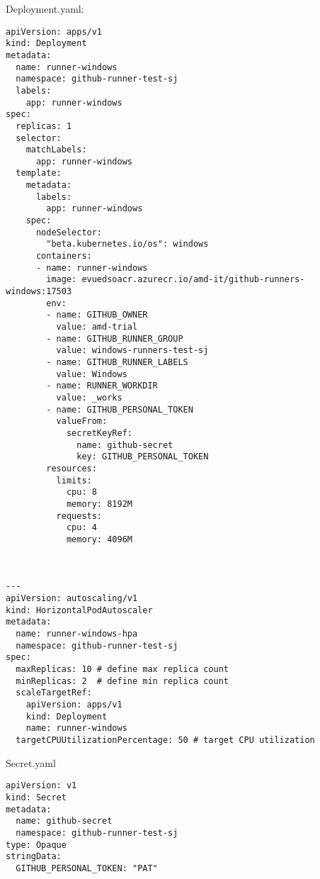Deployment.yaml:
\begin{lstlisting}[breaklines]
apiVersion: apps/v1
kind: Deployment
metadata:
  name: runner-windows
  namespace: github-runner-test-sj
  labels:
    app: runner-windows
spec:
  replicas: 1
  selector:
    matchLabels:
      app: runner-windows
  template:
    metadata:
      labels:
        app: runner-windows
    spec:
      nodeSelector:
        "beta.kubernetes.io/os": windows
      containers:
      - name: runner-windows
        image: evuedsoacr.azurecr.io/amd-it/github-runners-windows:17503
        env:
        - name: GITHUB_OWNER
          value: amd-trial
        - name: GITHUB_RUNNER_GROUP
          value: windows-runners-test-sj
        - name: GITHUB_RUNNER_LABELS
          value: Windows
        - name: RUNNER_WORKDIR
          value: _works
        - name: GITHUB_PERSONAL_TOKEN 
          valueFrom:
            secretKeyRef:
              name: github-secret
              key: GITHUB_PERSONAL_TOKEN
        resources:
          limits:
            cpu: 8
            memory: 8192M
          requests:
            cpu: 4
            memory: 4096M
      

           
---
apiVersion: autoscaling/v1
kind: HorizontalPodAutoscaler
metadata:
  name: runner-windows-hpa
  namespace: github-runner-test-sj
spec:
  maxReplicas: 10 # define max replica count
  minReplicas: 2  # define min replica count
  scaleTargetRef:
    apiVersion: apps/v1
    kind: Deployment
    name: runner-windows
  targetCPUUtilizationPercentage: 50 # target CPU utilization
\end{lstlisting}

Secret.yaml
\begin{lstlisting}[breaklines]
apiVersion: v1
kind: Secret
metadata:
  name: github-secret
  namespace: github-runner-test-sj
type: Opaque
stringData:
  GITHUB_PERSONAL_TOKEN: "PAT"
\end{lstlisting}